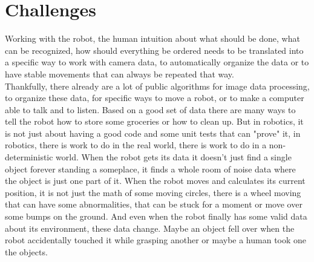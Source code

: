 \documentclass[main.tex]{subfiles}
\begin{document}
	\section{Challenges}
	\label{challanges}
	Working with the robot, the human intuition about what should be done, what can be recognized, how should everything be ordered needs to be translated into a specific way to work with camera data, to automatically organize the data or to have stable movements that can always be repeated that way.\\
	Thankfully, there already are a lot of public algorithms for image data processing, to organize these data, for specific ways to move a robot, or to make a computer able to talk and to listen. Based on a good set of data there are many ways to tell the robot how to store some groceries or how to clean up. But in robotics, it is not just about having a good code and some unit tests that can "prove" it, in robotics, there is work to do in the real world, there is work to do in a non-deterministic world. When the robot gets its data it doesn't just find a single object forever standing a someplace, it finds a whole room of noise data where the object is just one part of it. When the robot moves and calculates its current position, it is not just the math of some moving circles, there is a wheel moving that can have some abnormalities, that can be stuck for a moment or move over some bumps on the ground. And even when the robot finally has some valid data about its environment, these data change. Maybe an object fell over when the robot accidentally touched it while grasping another or maybe a human took one the objects.
	
\end{document}
